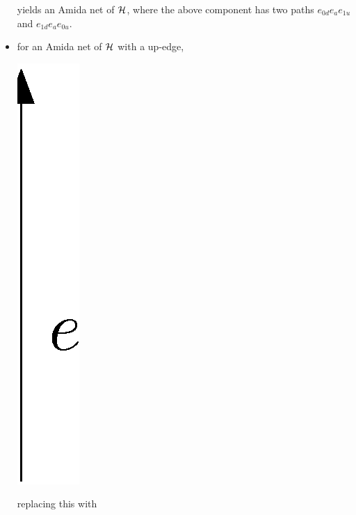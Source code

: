 \begin{definition}
\begin{itemize}
\begin{center}
	\end{center}
       yields an Amida net of $\mathcal{H}$,
       where the above component has two paths $e_{0d} e_a e_{1u}$
       and $e_{1d} e_a e_{0u}$.
 \item for an Amida net of $\mathcal{H}$ with a up-edge,
	\begin{center}
	 \includegraphics[scale=0.4]{oneedge.eps}
	\end{center}
       replacing this with
	\begin{center}

\end{center}
\end{itemize}
\end{definition}
